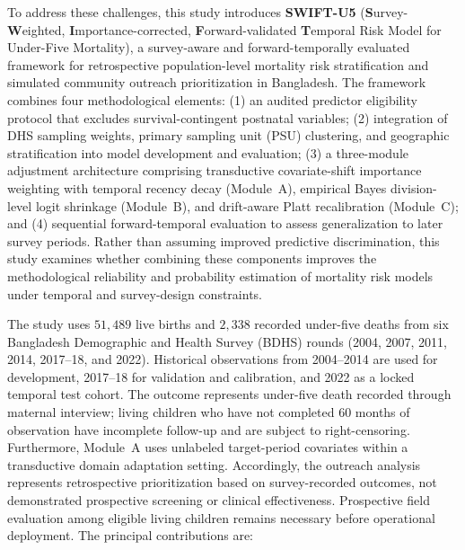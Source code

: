 \documentclass[a4paper,fleqn]{cas-sc}
\begin{document}
To address these challenges, this study introduces \textbf{SWIFT-U5} (\textbf{S}urvey-\textbf{W}eighted, \textbf{I}mportance-corrected, \textbf{F}orward-validated \textbf{T}emporal Risk Model for Under-Five Mortality), a survey-aware and forward-temporally evaluated framework for retrospective population-level mortality risk stratification and simulated community outreach prioritization in Bangladesh. The framework combines four methodological elements: (1) an audited predictor eligibility protocol that excludes survival-contingent postnatal variables; (2) integration of DHS sampling weights, primary sampling unit (PSU) clustering, and geographic stratification into model development and evaluation; (3) a three-module adjustment architecture comprising transductive covariate-shift importance weighting with temporal recency decay (Module~A), empirical Bayes division-level logit shrinkage (Module~B), and drift-aware Platt recalibration (Module~C); and (4) sequential forward-temporal evaluation to assess generalization to later survey periods. Rather than assuming improved predictive discrimination, this study examines whether combining these components improves the methodological reliability and probability estimation of mortality risk models under temporal and survey-design constraints.

The study uses $51{,}489$ live births and $2{,}338$ recorded under-five deaths from six Bangladesh Demographic and Health Survey (BDHS) rounds (2004, 2007, 2011, 2014, 2017--18, and 2022). Historical observations from 2004--2014 are used for development, 2017--18 for validation and calibration, and 2022 as a locked temporal test cohort. The outcome represents under-five death recorded through maternal interview; living children who have not completed 60 months of observation have incomplete follow-up and are subject to right-censoring. Furthermore, Module~A uses unlabeled target-period covariates within a transductive domain adaptation setting. Accordingly, the outreach analysis represents retrospective prioritization based on survey-recorded outcomes, not demonstrated prospective screening or clinical effectiveness. Prospective field evaluation among eligible living children remains necessary before operational deployment. The principal contributions are:
\end{document}
